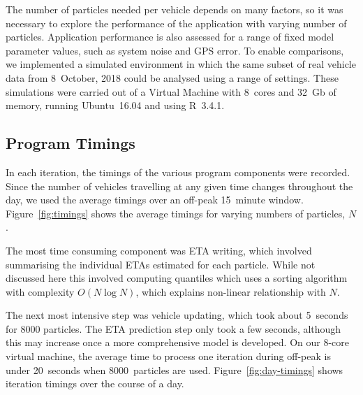 The number of particles needed per vehicle 
depends on many factors,
so it was necessary to explore the performance of the application
with varying number of particles.
Application performance is also assessed
for a range of fixed model parameter values,
such as system noise and GPS error.
To enable comparisons, we implemented a simulated \rt environment
in which the same subset of real vehicle data from 8~October, 2018
could be analysed using a range of settings.
These simulations were carried out of a Virtual Machine 
with 8~cores and 32~Gb of memory, 
running Ubuntu~16.04 and using R~3.4.1.


\subsection{Program Timings}
\label{sec:timings}

In each iteration, 
the timings of the various program components were recorded.
Since the number of vehicles travelling at any given time changes throughout the day,
we used the average timings over an off-peak 15~minute window.
Figure~\ref{fig:timings} shows the average timings for 
varying numbers of particles, $N$.


The most time consuming component was ETA writing,
which involved summarising the individual ETAs estimated for each particle.
While not discussed here this involved computing quantiles which uses a sorting algorithm
with complexity $O(N \log N)$,
which explains non-linear relationship with $N$.


The next most intensive step was vehicle updating,
which took about 5~seconds for 8000 particles.
The ETA prediction step only took a few seconds,
although this may increase once a more comprehensive model is developed.
On our 8-core virtual machine,
the average time to process one iteration during off-peak is under 20~seconds
when 8000~particles are used.
Figure~\ref{fig:day-timings} shows iteration timings over the course of a day.


